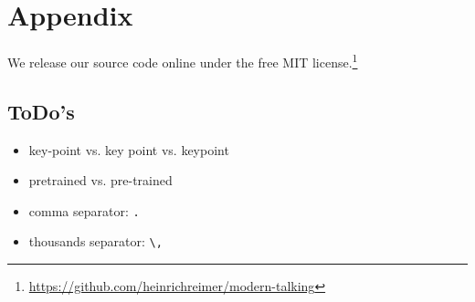 \appendix
\section{Appendix}

We release our source code online under the free MIT license.\footnote{\url{https://github.com/heinrichreimer/modern-talking}}

{\color{red}
    \subsection{ToDo's}
    \begin{itemize}
        \item key-point vs. key point vs. keypoint
        \item pretrained vs. pre-trained
        \item comma separator: \verb|.|
        \item thousands separator: \verb|\,|
    \end{itemize}
}
